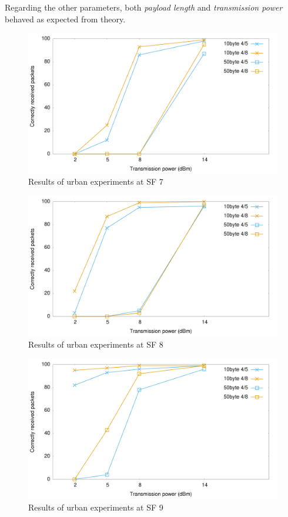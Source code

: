 Regarding the other parameters, both \emph{payload length} and \emph{transmission power} behaved as expected from theory.

\begin{figure}[]
\centering
\includegraphics[width=\textwidth]{img/test/urban/sf7}
\caption{Results of urban experiments at SF 7}
\label{fig:sf7urban}
\end{figure}

\begin{figure}[]
\centering
\includegraphics[width=\textwidth]{img/test/urban/sf8}
\caption{Results of urban experiments at SF 8}
\label{fig:sf8urban}
\end{figure}

\begin{figure}[]
\centering
\includegraphics[width=\textwidth]{img/test/urban/sf9}
\caption{Results of urban experiments at SF 9}
\label{fig:sf9urban}
\end{figure}

